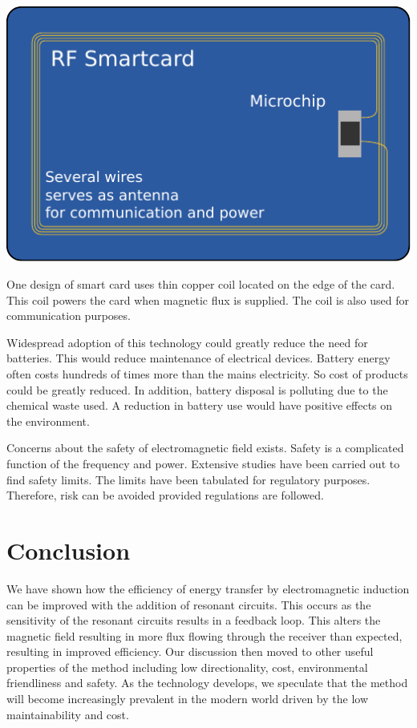 \documentclass[a4paper,justified,nobib]{tufte-handout}
\begin{document}
\begin{marginfigure}
  \includegraphics[scale=0.57]{images/smartcard.pdf}
  \caption{One design of smart card uses thin copper coil located on the
  edge of the card.
  This coil powers the card when magnetic flux is supplied.
  The coil is also used for communication purposes.\cite{wikiRIC}}
\end{marginfigure}

Widespread adoption of this technology could greatly reduce the need for batteries.
This would reduce maintenance of electrical devices.
Battery energy often costs
hundreds of times more than the mains electricity.
So cost of products could be greatly reduced.
In addition, battery disposal is polluting due to the chemical waste used.
A reduction in battery use would have positive effects on the environment.
\cite{Batteries}

Concerns about the safety of electromagnetic field exists.
Safety is a complicated function of the frequency and power.
Extensive studies have been carried out to find safety limits.
The limits have been tabulated for regulatory purposes.
Therefore, risk can be avoided provided regulations are followed.\cite{IEEE}

\section{Conclusion}

We have shown how the efficiency of energy transfer by electromagnetic
induction can be improved with the addition of resonant circuits.
This occurs as the sensitivity of the resonant circuits results in a feedback
loop.
This alters the magnetic field resulting in more flux flowing through the
receiver than expected, resulting in improved efficiency.
Our discussion then moved to other useful properties of the method including
low directionality, cost, environmental friendliness and safety.
As the technology develops, we speculate that the method will become
increasingly prevalent in the modern world driven by the low maintainability
and cost.




\printbibliography
\end{document}
